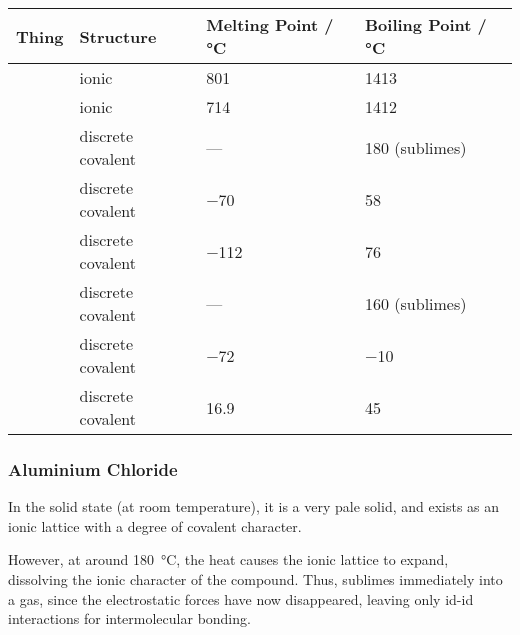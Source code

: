 			\begin{table}[htb]\renewcommand{\arraystretch}{1.5}\begin{center}
			\begin{tabu} to 0.9\textwidth { X[c,m] | X[c,m] | X[c,m] | X[c,m] }

				Thing       &   Structure           &   Melting Point / \si{\celsius}   &   Boiling Point / \si{\celsius}   \\ \hline
				  &   ionic               &   \num{801}                       &   \num{1413}                      \\
				 &   ionic               &   \num{714}                       &   \num{1412}                      \\
				&   discrete covalent   &   ---                             &   \num{180} (sublimes)            \\
				 &   discrete covalent   &   \num{-70}                       &   \num{58}                        \\
				  &   discrete covalent   &   \num{-112}                      &   \num{76}                        \\
				  &   discrete covalent   &   ---                             &   \num{160} (sublimes)            \\
				    &   discrete covalent   &   \num{-72}                       &   \num{-10}                       \\
				    &   discrete covalent   &   \num{16.9}                      &   \num{45}                        \\

			\end{tabu}\end{center}
			\end{table}\vspace{-1em}



			\subsubsection{Aluminium Chloride}

				In the solid state (at room temperature), it is a very pale solid, and exists as an ionic lattice with a 
				degree of covalent character.

				However, at around \SI{180}{\celsius}, the heat causes the ionic lattice to expand, dissolving the ionic character of the
				compound. Thus,  sublimes immediately into a gas, since the electrostatic forces have now disappeared,
				leaving only id-id interactions for intermolecular bonding.

